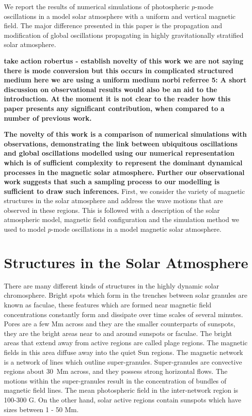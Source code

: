 \documentclass[linenumbers]{aastex63}
\newcommand{\bcr}{\bf\color{red}} %
\begin{document}
 

We report the results of numerical simulations of photospheric $p$-mode oscillations in a model solar atmosphere with a uniform and vertical magnetic field. The major difference presented in this paper is the propagation and modification of global oscillations propagating in highly gravitationally stratified solar atmosphere.  

{\bcr take action robertus - establish novelty of this work
we are not saying there is mode conversion but this occurs in complicated structured medium here we are using a uniform medium
norbi referree 5: A short discussion on observational results would also be an aid to the introduction. At the moment it is not clear to the reader how this paper presents any significant contribution, when compared to a number of previous work.

}
{\bcr The novelty of this work is a comparison of numerical simulations with observations, demonstrating the link between ubiquitous oscillations and global oscillations modelled using our numerical representation which is of sufficient complexity to represent the dominant dynamical processes in the magnetic solar atmosphere. Further our observational work suggests that such a sampling process to our modelling is sufficient to draw such inferences.} First, we consider the variety of magnetic structures in the solar atmosphere and address the wave motions that are observed in these regions. This is followed with a description of the solar atmospheric model, magnetic field configuration and the simulation method we used to model $p$-mode oscillations in a model magnetic solar atmosphere.

\section{Structures in the Solar Atmosphere} 
\label{sec:structures}


There are many different kinds of structures in the highly dynamic solar chromosphere. Bright spots which form in the trenches between solar granules are known as faculae, these features which are formed near magnetic field concentrations constantly form and dissipate over time scales of several minutes. Pores are a few Mm across and they are the smaller counterparts of sunspots, they are the bright areas near to and around sunspots or faculae. The bright areas that extend away from active regions are called plage regions.  The magnetic fields in this area diffuse away into the quiet Sun regions. The magnetic network is a network of lines which outline super-granules. Super-granules are convective regions about 30~Mm across, and they possess strong horizontal flows. The motions within the super-granules result in the concentration of bundles of magnetic field lines.  The mean photospheric field in the inter-network region is 100-300 G. On the other hand, solar active regions contain sunspots which have sizes between  1 - 50 Mm. 
\end{document}
